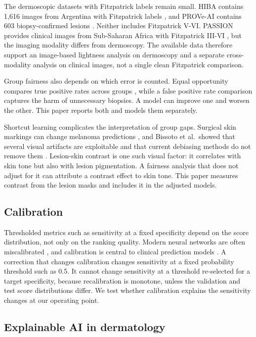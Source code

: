 The dermoscopic datasets with Fitzpatrick labels remain small. HIBA contains 1,616 images from Argentina with Fitzpatrick labels \citep{hiba2023}, and PROVe-AI contains 603 biopsy-confirmed lesions \citep{proveai2023}. Neither includes Fitzpatrick V-VI. PASSION provides clinical images from Sub-Saharan Africa with Fitzpatrick III-VI \citep{passion2024}, but the imaging modality differs from dermoscopy. The available data therefore support an image-based lightness analysis on dermoscopy and a separate cross-modality analysis on clinical images, not a single clean Fitzpatrick comparison.

Group fairness also depends on which error is counted. Equal opportunity compares true positive rates across groups \citep{hardt2016equality}, while a false positive rate comparison captures the harm of unnecessary biopsies. A model can improve one and worsen the other. This paper reports both and models them separately.

Shortcut learning complicates the interpretation of group gaps. Surgical skin markings can change melanoma predictions \citep{winkler2019markings}, and Bissoto et al.\ showed that several visual artifacts are exploitable and that current debiasing methods do not remove them \citep{bissoto2020debiasing}. Lesion-skin contrast is one such visual factor: it correlates with skin tone but also with lesion pigmentation. A fairness analysis that does not adjust for it can attribute a contrast effect to skin tone. This paper measures contrast from the lesion masks and includes it in the adjusted models.

\subsection{Calibration}

Thresholded metrics such as sensitivity at a fixed specificity depend on the score distribution, not only on the ranking quality. Modern neural networks are often miscalibrated \citep{guo2017calibration}, and calibration is central to clinical prediction models \citep{vancalster2019calibration}. A correction that changes calibration changes sensitivity at a fixed probability threshold such as 0.5. It cannot change sensitivity at a threshold re-selected for a target specificity, because recalibration is monotone, unless the validation and test score distributions differ. We test whether calibration explains the sensitivity changes at our operating point.

\subsection{Explainable AI in dermatology}

